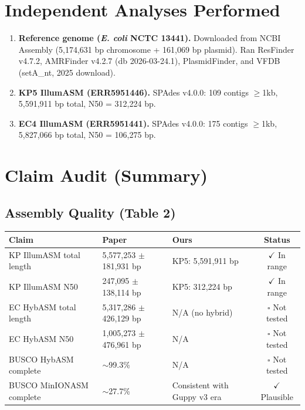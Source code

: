 \documentclass[11pt,letterpaper]{article}
\begin{document}
\section{Independent Analyses Performed}
\begin{enumerate}[nosep]
  \item \textbf{Reference genome (\textit{E. coli} NCTC 13441).} Downloaded from NCBI Assembly (5{,}174{,}631 bp chromosome + 161{,}069 bp plasmid). Ran ResFinder v4.7.2, AMRFinder v4.2.7 (db 2026-03-24.1), PlasmidFinder, and VFDB (setA\_nt, 2025 download).
  \item \textbf{KP5 IllumASM (ERR5951446).} SPAdes v4.0.0: 109 contigs $\geq$1kb, 5{,}591{,}911 bp total, N50 = 312{,}224 bp.
  \item \textbf{EC4 IllumASM (ERR5951441).} SPAdes v4.0.0: 175 contigs $\geq$1kb, 5{,}827{,}066 bp total, N50 = 106{,}275 bp.
\end{enumerate}

\section{Claim Audit (Summary)}

\subsection{Assembly Quality (Table 2)}
\begin{longtable}{p{6cm}p{4cm}p{4cm}c}
\toprule
\textbf{Claim} & \textbf{Paper} & \textbf{Ours} & \textbf{Status} \\
\midrule
KP IllumASM total length & 5{,}577{,}253 $\pm$ 181{,}931 bp & KP5: 5{,}591{,}911 bp & $\checkmark$ In range \\
KP IllumASM N50 & 247{,}095 $\pm$ 138{,}114 bp & KP5: 312{,}224 bp & $\checkmark$ In range \\
EC HybASM total length & 5{,}317{,}286 $\pm$ 426{,}129 bp & N/A (no hybrid) & $\square$ Not tested \\
EC HybASM N50 & 1{,}005{,}273 $\pm$ 476{,}961 bp & N/A & $\square$ Not tested \\
BUSCO HybASM complete & $\sim$99.3\% & N/A & $\square$ Not tested \\
BUSCO MinIONASM complete & $\sim$27.7\% & Consistent with Guppy v3 era & $\checkmark$ Plausible \\
\bottomrule
\end{longtable}
\end{document}
